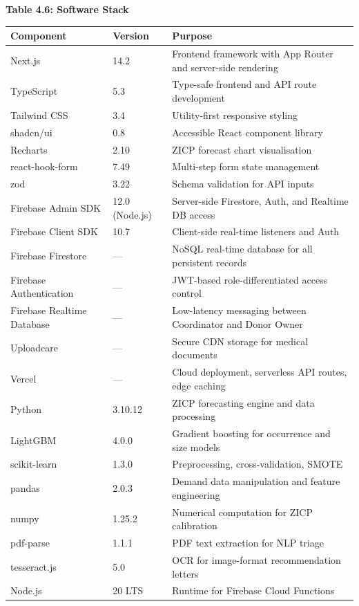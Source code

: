 \documentclass[12pt,a4paper]{article}
\begin{document}
\begin{center}
\textbf{Table 4.6: Software Stack}
\vspace{0.4em}
\begin{tabular}{p{3.5cm} p{3cm} p{6cm}}
\toprule
\textbf{Component} & \textbf{Version} & \textbf{Purpose} \\
\midrule
Next.js & 14.2 & Frontend framework with App Router and server-side rendering \\
TypeScript & 5.3 & Type-safe frontend and API route development \\
Tailwind CSS & 3.4 & Utility-first responsive styling \\
shadcn/ui & 0.8 & Accessible React component library \\
Recharts & 2.10 & ZICP forecast chart visualisation \\
react-hook-form & 7.49 & Multi-step form state management \\
zod & 3.22 & Schema validation for API inputs \\
Firebase Admin SDK & 12.0 (Node.js) & Server-side Firestore, Auth, and Realtime DB access \\
Firebase Client SDK & 10.7 & Client-side real-time listeners and Auth \\
Firebase Firestore & — & NoSQL real-time database for all persistent records \\
Firebase Authentication & — & JWT-based role-differentiated access control \\
Firebase Realtime Database & — & Low-latency messaging between Coordinator and Donor Owner \\
Uploadcare & — & Secure CDN storage for medical documents \\
Vercel & — & Cloud deployment, serverless API routes, edge caching \\
Python & 3.10.12 & ZICP forecasting engine and data processing \\
LightGBM & 4.0.0 & Gradient boosting for occurrence and size models \\
scikit-learn & 1.3.0 & Preprocessing, cross-validation, SMOTE \\
pandas & 2.0.3 & Demand data manipulation and feature engineering \\
numpy & 1.25.2 & Numerical computation for ZICP calibration \\
pdf-parse & 1.1.1 & PDF text extraction for NLP triage \\
tesseract.js & 5.0 & OCR for image-format recommendation letters \\
Node.js & 20 LTS & Runtime for Firebase Cloud Functions \\
\bottomrule
\end{tabular}
\end{center}
\end{document}
